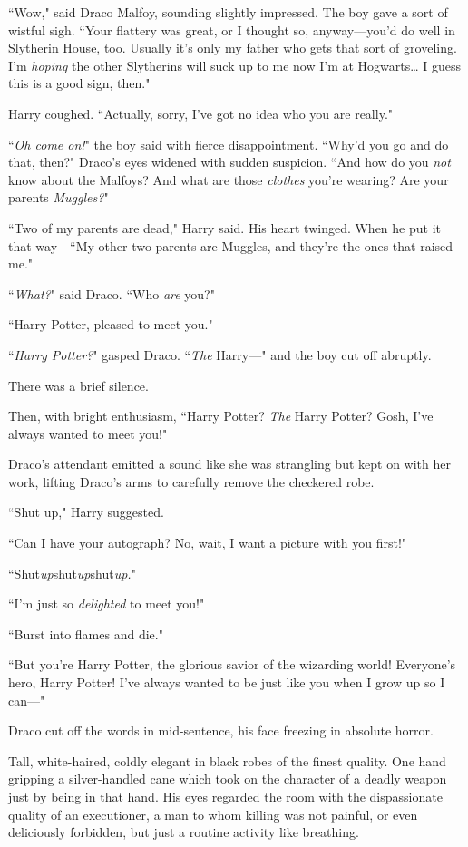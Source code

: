 ``Wow," said Draco Malfoy, sounding slightly impressed. The boy gave a sort of wistful sigh. ``Your flattery was great, or I thought so, anyway---you'd do well in Slytherin House, too. Usually it's only my father who gets that sort of groveling. I'm \emph{hoping} the other Slytherins will suck up to me now I'm at Hogwarts{\ldots} I guess this is a good sign, then."

Harry coughed. ``Actually, sorry, I've got no idea who you are really."

``\emph{Oh come on!}" the boy said with fierce disappointment. ``Why'd you go and do that, then?" Draco's eyes widened with sudden suspicion. ``And how do you \emph{not} know about the Malfoys? And what are those \emph{clothes} you're wearing? Are your parents \emph{Muggles?}"

``Two of my parents are dead," Harry said. His heart twinged. When he put it that way---``My other two parents are Muggles, and they're the ones that raised me."

``\emph{What?}" said Draco. ``Who \emph{are} you?"

``Harry Potter, pleased to meet you."

``\emph{Harry Potter?}" gasped Draco. ``\emph{The} Harry---" and the boy cut off abruptly.

There was a brief silence.

Then, with bright enthusiasm, ``Harry Potter? \emph{The} Harry Potter? Gosh, I've always wanted to meet you!"

Draco's attendant emitted a sound like she was strangling but kept on with her work, lifting Draco's arms to carefully remove the checkered robe.

``Shut up," Harry suggested.

``Can I have your autograph? No, wait, I want a picture with you first!"

``Shut\emph{up}shut\emph{up}shut\emph{up.}"

``I'm just so \emph{delighted} to meet you!"

``Burst into flames and die."

``But you're Harry Potter, the glorious savior of the wizarding world! Everyone's hero, Harry Potter! I've always wanted to be just like you when I grow up so I can---"

Draco cut off the words in mid-sentence, his face freezing in absolute horror.

Tall, white-haired, coldly elegant in black robes of the finest quality. One hand gripping a silver-handled cane which took on the character of a deadly weapon just by being in that hand. His eyes regarded the room with the dispassionate quality of an executioner, a man to whom killing was not painful, or even deliciously forbidden, but just a routine activity like breathing.

